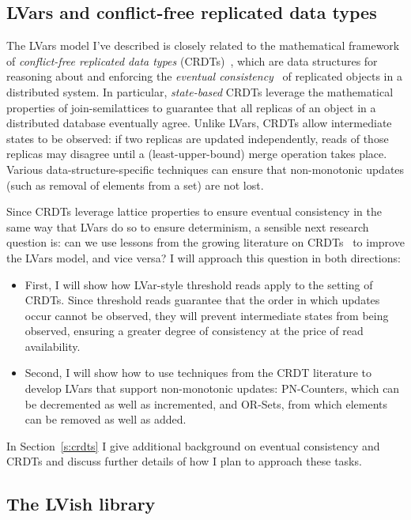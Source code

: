 \documentclass{article}
\begin{document}
\subsection{LVars and conflict-free replicated data types}

The LVars model I've described is closely related to the mathematical
framework of \emph{conflict-free replicated data types}
(CRDTs)~\cite{crdts}, which are data structures for
reasoning about and enforcing the \emph{eventual
  consistency}~\cite{vogels-ec} of replicated objects in a distributed
system.  In particular, \emph{state-based} CRDTs leverage the
mathematical properties of join-semilattices to guarantee that all
replicas of an object in a distributed database eventually agree.
Unlike LVars, CRDTs allow intermediate states to be observed: if two
replicas are updated independently, reads of those replicas may
disagree until a (least-upper-bound) merge operation takes place.
Various data-structure-specific techniques can ensure that
non-monotonic updates (such as removal of elements from a set) are not
lost.

Since CRDTs leverage lattice properties to ensure eventual consistency
in the same way that LVars do so to ensure determinism, a sensible
next research question is: can we use lessons from the growing
literature on CRDTs~\cite{crdts, crdts-tr, rdts-popl14} to
improve the LVars model, and vice versa?  I will approach this
question in both directions:
\begin{itemize}
\item First, I will show how LVar-style threshold reads apply to the
  setting of CRDTs.  Since threshold reads guarantee that the order in
  which updates occur cannot be observed, they will prevent
  intermediate states from being observed, ensuring a greater degree
  of consistency at the price of read availability.
\item Second, I will show how to use techniques from the CRDT
  literature to develop LVars that support non-monotonic updates:
  PN-Counters, which can be decremented as well as incremented, and
  OR-Sets, from which elements can be removed as well as added.
\end{itemize}
In Section~\ref{s:crdts} I give additional background on eventual
consistency and CRDTs and discuss further details of how I plan to
approach these tasks.

\subsection{The LVish library}
\end{document}

